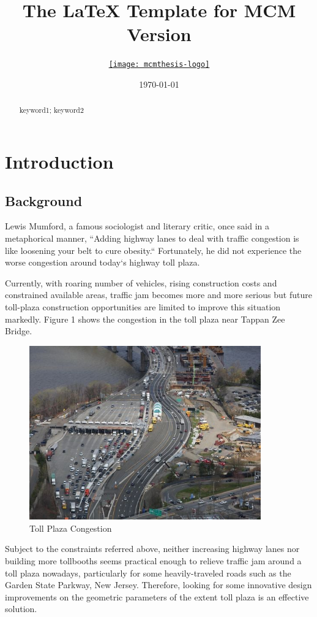 \documentclass{mcmthesis}
\title{The \LaTeX{} Template for MCM Version \MCMversion}
\author{\small \href{http://www.latexstudio.net/}
  {\texttt{[image: mcmthesis-logo]}}}
\date{\today}
\begin{document}
\begin{abstract}
\lipsum[1]%
\begin{keywords}
keyword1; keyword2
\end{keywords}
\end{abstract}
\maketitle
\tableofcontents
\newpage

\section{Introduction}
\subsection{Background}

Lewis Mumford, a famous sociologist and literary critic,
once said in a metaphorical manner, ``Adding highway lanes
to deal with traffic congestion is like loosening your
belt to cure obesity.`` Fortunately, he did not experience
the worse congestion around today`s highway toll plaza.

Currently, with roaring number of vehicles, rising
construction costs and constrained available areas,
traffic jam becomes more and more serious but future
toll-plaza construction opportunities are limited to
improve this situation markedly. Figure 1 shows the
congestion in the toll plaza near Tappan Zee Bridge.

\begin{figure}[h]
\small
\centering
\includegraphics[width=10cm]{figure1}
\caption{Toll Plaza Congestion}\label{fig1}
\end{figure}

Subject to the constraints referred above, neither
increasing highway lanes nor building more tollbooths
seems practical enough to relieve traffic jam around a
toll plaza nowadays, particularly for some heavily-traveled
 roads such as the Garden State Parkway, New Jersey.
 Therefore, looking for some innovative design improvements
  on the geometric parameters of the extent toll plaza
  is an effective solution.
\end{document}
